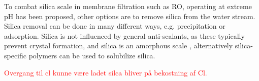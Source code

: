 To combat silica scale in membrane filtration such as RO, operating at extreme pH has been proposed, other options are to remove silica from the water stream. 
Silica removal can be done in many different ways, e.g. precipitation or adsorption.\citep{ChemistrySilicaScale2014} 
Silica is not influenced by general anti-scalants, as these typically prevent crystal formation, and silica is an amorphous scale  \citep{ChemistrySilicaScale2014},  
alternatively silica-specific polymers can be used to solubilize silica. \citep{IntroductionCoolingTower2014}


\textcolor{red}{Overgang til cl kunne være ladet silca bliver på bekostning af Cl. }














